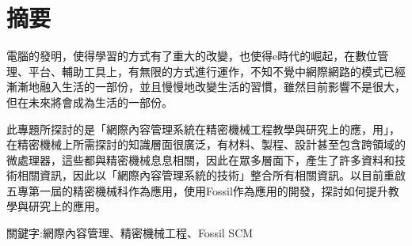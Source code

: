\setcounter{page}{0}  %
\chapter*{摘要}
\renewcommand{\baselinestretch}{2} %
\twelve 電腦的發明，使得學習的方式有了重大的改變，也使得e時代的崛起，在數位管理、平台、輔助工具上，有無限的方式進行運作，不知不覺中網際網路的模式已經漸漸地融入生活的一部份，並且慢慢地改變生活的習慣，雖然目前影響不是很大，但在未來將會成為生活的一部份。
\\
\par
\renewcommand{\baselinestretch}{1} %
\twelve 此專題所探討的是「網際內容管理系統在精密機械工程教學與研究上的應，用」，在精密機械上所需探討的知識層面很廣泛，有材料、製程、設計甚至包含跨領域的微處理器，這些都與精密機械息息相關，因此在眾多層面下，產生了許多資料和技術相關資訊，因此以「網際內容管理系統的技術」整合所有相關資訊。以目前重啟五專第一屆的精密機械科作為應用，使用Fossil作為應用的開發，探討如何提升教學與研究上的應用。\\
\par
\begin{center}
\twelve 關鍵字:網際內容管理、精密機械工程、Fossil SCM
\end{center}
\par
